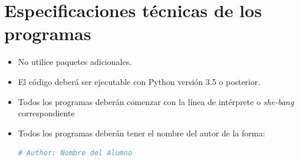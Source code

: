 \documentclass[letterpaper,10.5pt]{article}
\begin{document}
\section{Especificaciones técnicas de los programas}%
\label{sec:programs-specs}
\begin{itemize}[noitemsep]
	\item No utilice paquetes adicionales.
	\item El código deberá ser ejecutable con Python versión 3.5 o posterior.
	\item Todos los programas deberán comenzar con la línea de intérprete o \emph{she-bang} correspondiente
	\item Todos los programas deberán tener el nombre del autor de la forma:

\begin{lstlisting}[language=python]
# Author: Nombre del Alumno
\end{lstlisting}


\end{itemize}
\end{document}
